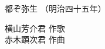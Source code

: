 \documentclass[10pt,b5j]{tarticle} %
\begin{document}
\thispagestyle{empty} %
\newcommand{\linespace}{0.4em} %
\newcommand{\blocksize}{0.33\hsize} %

\begin{minipage}[c]{0.7\hsize} %
    \begin{center}
        {\LARGE
            都ぞ弥生 %
        }
        {\small 
            （明治四十五年） %
        }
    \end{center}
\end{minipage}
\begin{minipage}[c]{0.3\hsize} %
    \begin{flushright} %
        横山芳介君 作歌\\ %
        赤木顕次君 作曲 %
    \end{flushright}
\end{minipage}


\vspace{0.8em} %
\end{document}

